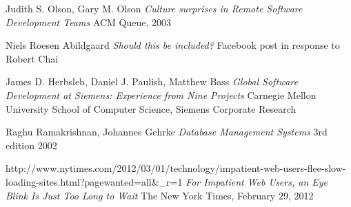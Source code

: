 \begin{thebibliography}{9}

		Judith S. Olson, Gary M. Olson\newline
		\emph{Culture surprises in Remote Software Development Teams}\newline
		ACM Queue, 2003

		Niels Roesen Abildgaard\newline
		\emph{Should this be included?}\newline
		Facebook post in response to Robert Chai

		James D. Herbsleb, Daniel J. Paulish, Matthew Bass\newline
		\emph{Global Software Development at Siemens: Experience from Nine Projects}
		Carnegie Mellon University School of Computer Science,
		Siemens Corporate Research 
	
		Raghu Ramakrishnan, Johannes Gehrke\newline
		\emph{Database Management Systems}\newline
		3rd edition 2002

		http://www.nytimes.com/2012/03/01/technology/impatient-web-users-flee-slow-loading-sites.html?pagewanted=all\&_r=1\newline
		\emph{For Impatient Web Users, an Eye Blink Is Just Too Long to Wait}\newline
		The New York Times, February 29, 2012

\end{thebibliography}
